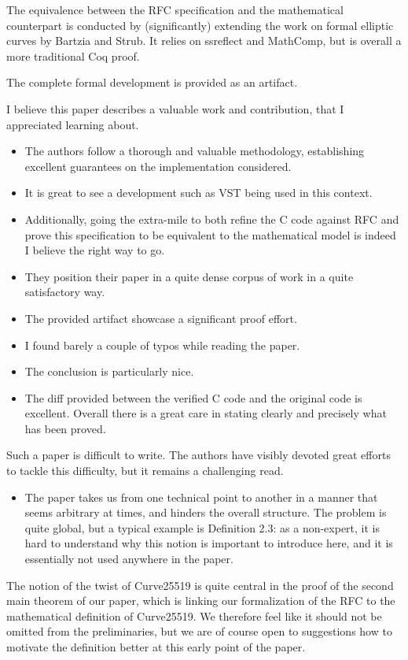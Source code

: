 The equivalence between the RFC specification and the mathematical counterpart
is conducted by (significantly) extending the work on formal elliptic curves by
Bartzia and Strub. It relies on ssreflect and MathComp, but is overall a more
traditional Coq proof.

The complete formal development is provided as an artifact.

\begin{center}
\end{center}
I believe this paper describes a valuable work and contribution, that I appreciated learning about.
\begin{itemize}
  \item The authors follow a thorough and valuable methodology, establishing excellent guarantees on the implementation considered.
  \item It is great to see a development such as VST being used in this context.
  \item Additionally, going the extra-mile to both refine the C code against RFC and prove this specification to be equivalent to the mathematical model is indeed I believe the right way to go.
  \item They position their paper in a quite dense corpus of work in a quite satisfactory way.
  \item The provided artifact showcase a significant proof effort.
  \item I found barely a couple of typos while reading the paper.
  \item The conclusion is particularly nice.
  \item The diff provided between the verified C code and the original code is excellent. Overall there is a great care in stating clearly and precisely what has been proved.
\end{itemize}

\begin{center}
\end{center}

Such a paper is difficult to write. The authors have visibly devoted great efforts to tackle this difficulty, but it remains a challenging read.
\begin{itemize}
  \item The paper takes us from one technical point to another in a manner that seems arbitrary at times, and hinders the overall structure. The problem is quite global, but a typical example is Definition 2.3: as a non-expert, it is hard to understand why this notion is important to introduce here, and it is essentially not used anywhere in the paper.
\end{itemize}
\begin{answer}
  The notion of the twist of Curve25519 is quite central in the proof of the second main theorem of our paper,
  which is linking our formalization of the RFC to the mathematical definition of Curve25519.
  We therefore feel like it should not be omitted from the preliminaries, but we are of course
  open to suggestions how to motivate the definition better at this early point of the paper.
\end{answer}

